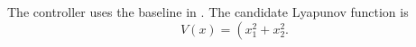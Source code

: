 \documentclass{article}
\begin{document}
The controller uses the baseline in \cite{missingReference}. The candidate Lyapunov function is
\[
  V(x) = \left( x_1^2 + x_2^2.
\]
\end{document}
